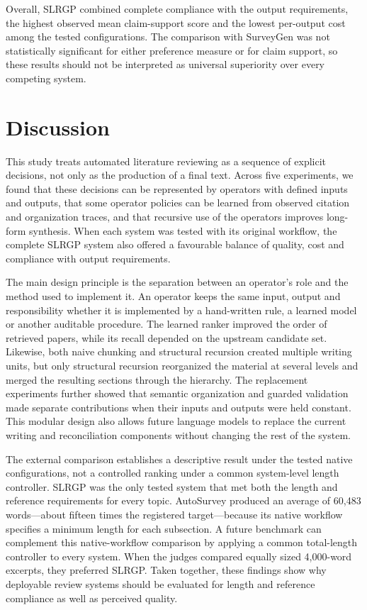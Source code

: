 \documentclass[11pt,a4paper]{article}
\begin{document}
Overall, SLRGP combined complete compliance with the output requirements, the highest observed mean claim-support score and the lowest per-output cost among the tested configurations. The comparison with SurveyGen was not statistically significant for either preference measure or for claim support, so these results should not be interpreted as universal superiority over every competing system.

\section*{Discussion}

This study treats automated literature reviewing as a sequence of explicit decisions, not only as the production of a final text. Across five experiments, we found that these decisions can be represented by operators with defined inputs and outputs, that some operator policies can be learned from observed citation and organization traces, and that recursive use of the operators improves long-form synthesis. When each system was tested with its original workflow, the complete SLRGP system also offered a favourable balance of quality, cost and compliance with output requirements.

The main design principle is the separation between an operator's role and the method used to implement it. An operator keeps the same input, output and responsibility whether it is implemented by a hand-written rule, a learned model or another auditable procedure. The learned ranker improved the order of retrieved papers, while its recall depended on the upstream candidate set. Likewise, both naive chunking and structural recursion created multiple writing units, but only structural recursion reorganized the material at several levels and merged the resulting sections through the hierarchy. The replacement experiments further showed that semantic organization and guarded validation made separate contributions when their inputs and outputs were held constant. This modular design also allows future language models to replace the current writing and reconciliation components without changing the rest of the system.

The external comparison establishes a descriptive result under the tested native configurations, not a controlled ranking under a common system-level length controller. SLRGP was the only tested system that met both the length and reference requirements for every topic. AutoSurvey produced an average of 60,483 words---about fifteen times the registered target---because its native workflow specifies a minimum length for each subsection. A future benchmark can complement this native-workflow comparison by applying a common total-length controller to every system. When the judges compared equally sized 4,000-word excerpts, they preferred SLRGP. Taken together, these findings show why deployable review systems should be evaluated for length and reference compliance as well as perceived quality.
\end{document}
